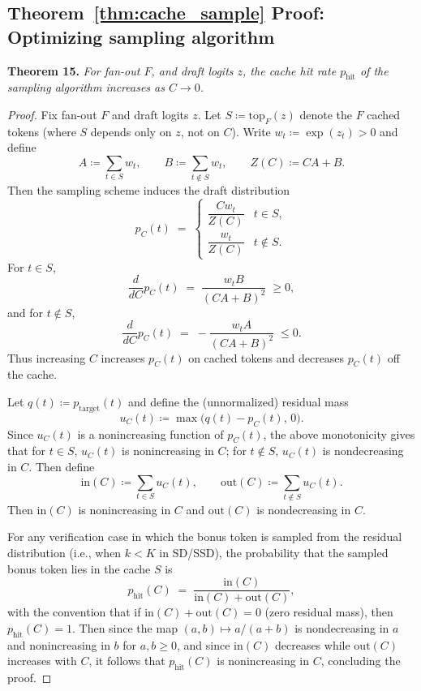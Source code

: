 \subsection{Theorem~\ref{thm:cache_sample} Proof: Optimizing \Sys sampling algorithm}

\textbf{Theorem 15.}
\label{thm:cache_sample_app}
\textit{For fan-out $F$, and draft logits $z$, the cache hit rate $p_{\mathrm{hit}}$ of the \Sys sampling algorithm increases as $C \rightarrow 0$.}

{
\begin{proof}
Fix fan-out $F$ and draft logits $z$. Let $S \coloneqq \mathrm{top}_F(z)$ denote the $F$ cached tokens (where $S$ depends only on $z$, not on $C$). Write $w_t \coloneqq \exp(z_t)>0$ and define
\[
A \coloneqq \sum_{t\in S} w_t,\qquad B \coloneqq \sum_{t\notin S} w_t,\qquad Z(C)\coloneqq CA + B.
\]
Then the \Sys sampling scheme induces the draft distribution
\[
p_C(t) \;=\;
\begin{cases}
\dfrac{Cw_t}{Z(C)} & t\in S,\\[6pt]
\dfrac{w_t}{Z(C)} & t\notin S.
\end{cases}
\]
For $t\in S$,
\[
\frac{d}{dC}p_C(t) \;=\; \frac{w_t B}{(CA+B)^2}\;\ge 0,
\]
and for $t\notin S$,
\[
\frac{d}{dC}p_C(t) \;=\; -\frac{w_t A}{(CA+B)^2}\;\le 0.
\]
Thus increasing $C$ increases $p_C(t)$ on cached tokens and decreases $p_C(t)$ off the cache.

Let $q(t)\coloneqq p_{\mathrm{target}}(t)$ and define the (unnormalized) residual mass
\[
u_C(t) \coloneqq \max\!\big(q(t)-p_C(t),\,0\big).
\]
Since $u_C(t)$ is a nonincreasing function of $p_C(t)$, the above monotonicity gives that
for $t\in S$, $u_C(t)$ is nonincreasing in $C$; for $t\notin S$, $u_C(t)$ is nondecreasing in $C$.
Then define
\[
\mathrm{in}(C)\coloneqq \sum_{t\in S} u_C(t),\qquad \mathrm{out}(C)\coloneqq \sum_{t\notin S} u_C(t).
\]
Then $\mathrm{in}(C)$ is nonincreasing in $C$ and $\mathrm{out}(C)$ is nondecreasing in $C$.

For any verification case in which the bonus token is sampled from the residual distribution (i.e., when $k<K$ in SD/SSD), the probability that the sampled bonus token lies in the cache $S$ is
\[
p_{\mathrm{hit}}(C)\;=\;\frac{\mathrm{in}(C)}{\mathrm{in}(C)+\mathrm{out}(C)},
\]
with the convention that if $\mathrm{in}(C)+\mathrm{out}(C)=0$ (zero residual mass), then $p_{\mathrm{hit}}(C)=1$.
Then since the map $(a,b)\mapsto a/(a+b)$ is nondecreasing in $a$ and nonincreasing in $b$ for $a,b\ge 0$, and since $\mathrm{in}(C)$ decreases while $\mathrm{out}(C)$ increases with $C$, it follows that $p_{\mathrm{hit}}(C)$ is nonincreasing in $C$, concluding the proof. 
\end{proof}
}



